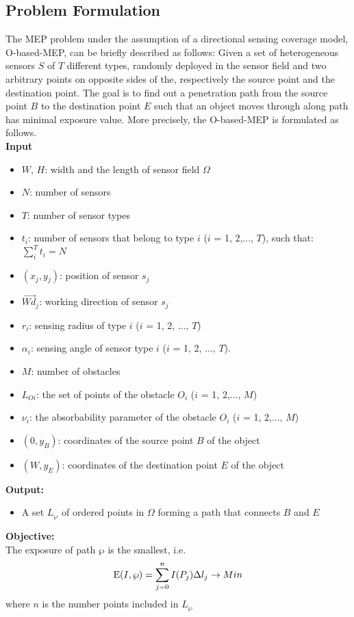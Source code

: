 \documentclass[final]{elsarticle}
\begin{document}
\subsection{Problem Formulation}
The MEP problem under the assumption of a directional sensing coverage model, O-based-MEP, can be briefly described as follows: Given a set of heterogeneous sensors $S$ of $T$ different types, randomly deployed in the sensor field   and two arbitrary points on opposite sides of the, respectively the source point and the destination point. The goal is to find out a penetration path from the source point $B$ to the destination point $E$ such that an object moves through along path has minimal exposure value. More precisely, the O-based-MEP is formulated as follows.\\
\textbf{Input}
\begin{itemize}
		\itemsep-0.2em
		\item $W$, $H$: width and the length of sensor field $\Omega$
		\item $N$: number of sensors
		\item $ T $: number of sensor types
		\item $ t_i $: number of sensors that belong to type $ i $ ($ i $ = 1, 2,..., $T$), such that:
		 $\sum\limits_i^T {{t_i}}  = N$
		 \item $({x_j},y{}_j)$: position of sensor $ s_j $
		 \item $\overrightarrow{Wd}_j$: working direction of sensor $s_j$
		 \item $ r_i $: sensing radius of type $ i $ ($ i $ = 1, 2, ..., $ T $)
		 \item ${\alpha _i}$: sensing angle of sensor type $ i $ ($ i $ = 1, 2, ..., $ T $).
		 \item $M$: number of obstacles
		 \item $ L_{Oi} $: the set of points of the obstacle $O_i$ ($ i $ = 1, 2,..., $M$)
		 \item $ \nu_i $: the absorbability parameter of the obstacle $O_i$ ($ i $ = 1, 2,..., $M$)
		\item $(0, y_B)$: coordinates of the source point $B$ of the object
		\item $(W, y_E)$: coordinates of the destination point $E$ of the object
\end{itemize}
\textbf{Output:}
\begin{itemize}
	\item A set ${L_\wp }$ of ordered points in $\Omega $ forming a path that connects $ B $ and $ E $ 
\end{itemize}
\textbf{Objective:}\\
The exposure of path  $\wp $ is the smallest, i.e.
\begin{equation}
\label{eqEmin}
{\rm E}(I,\wp ) = \sum\limits_{j = 0}^n {I(P_j)\Delta l_j}  \to Min
\end{equation}
where $ n $ is the number points included in ${L_\wp }$
\end{document}
